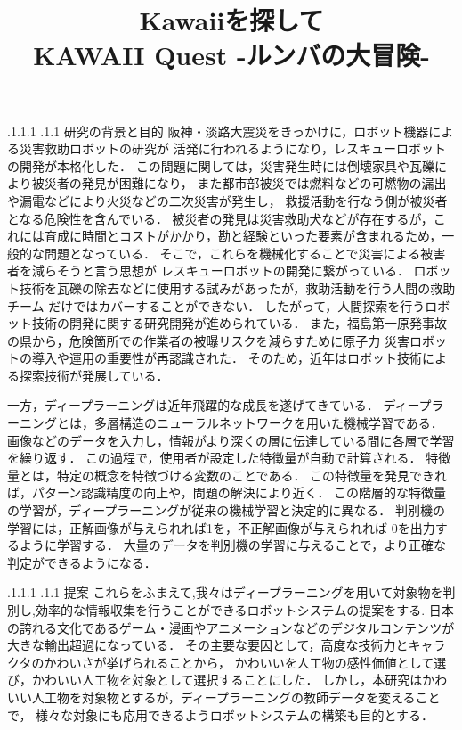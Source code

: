 \documentclass[a4paper, twocolumn]{jarticle}
\makeatletter
\def\section{\@startsection{section}{1}{\z@}%
 {.1\Cvs \@plus.1\Cdp \@minus.1\Cdp}%
 {.1\Cvs \@plus.1\Cdp}%
 {\normalfont\normalsize\bfseries}}
\makeatother
\begin{document}
\title{Kawaiiを探して\\KAWAII Quest -ルンバの大冒険-}
\date{}
\maketitle
\thispagestyle{empty}

\maketitle
\section{研究の背景と目的}
阪神・淡路大震災をきっかけに，ロボット機器による災害救助ロボットの研究が
活発に行われるようになり，レスキューロボットの開発が本格化した．
この問題に関しては，災害発生時には倒壊家具や瓦礫により被災者の発見が困難になり，
また都市部被災では燃料などの可燃物の漏出や漏電などにより火災などの二次災害が発生し，
救援活動を行なう側が被災者となる危険性を含んでいる．
被災者の発見は災害救助犬などが存在するが，これには育成に時間とコストがかかり，勘と経験といった要素が含まれるため，一般的な問題となっている．
そこで，これらを機械化することで災害による被害者を減らそうと言う思想が
レスキューロボットの開発に繋がっている．
ロボット技術を瓦礫の除去などに使用する試みがあったが，救助活動を行う人間の救助チーム
だけではカバーすることができない．
したがって，人間探索を行うロボット技術の開発に関する研究開発が進められている．
また，福島第一原発事故の県から，危険箇所での作業者の被曝リスクを減らすために原子力
災害ロボットの導入や運用の重要性が再認識された．
そのため，近年はロボット技術による探索技術が発展している．

一方，ディープラーニングは近年飛躍的な成長を遂げてきている．
ディープラーニングとは，多層構造のニューラルネットワークを用いた機械学習である．
画像などのデータを入力し，情報がより深くの層に伝達している間に各層で学習を繰り返す．
この過程で，使用者が設定した特徴量が自動で計算される．
特徴量とは，特定の概念を特徴づける変数のことである．
この特徴量を発見できれば，パターン認識精度の向上や，問題の解決により近く．
この階層的な特徴量の学習が，ディープラーニングが従来の機械学習と決定的に異なる．
判別機の学習には，正解画像が与えられれば1を，不正解画像が与えられれば
0を出力するように学習する．
大量のデータを判別機の学習に与えることで，より正確な判定ができるようになる．

\section{提案}
これらをふまえて,我々はディープラーニングを用いて対象物を判別し,効率的な情報収集を行うことができるロボットシステムの提案をする.
日本の誇れる文化であるゲーム・漫画やアニメーションなどのデジタルコンテンツが
大きな輸出超過になっている\cite{kawaii1}．
その主要な要因として，高度な技術力とキャラクタのかわいさが挙げられることから，
かわいいを人工物の感性価値として選び，かわいい人工物を対象として選択することにした．
しかし，本研究はかわいい人工物を対象物とするが，ディープラーニングの教師データを変えることで，
様々な対象にも応用できるようロボットシステムの構築も目的とする．
\end{document}

